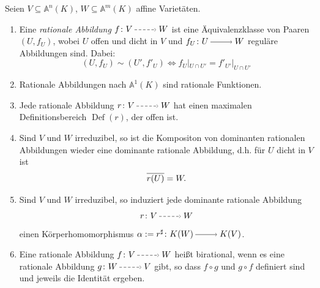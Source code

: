 \documentclass[a4paper,12pt]{scrbook}
\theoremstyle{keinenummern} %
\theoremstyle{mitnummern}
\theoremstyle{unserbeweis}
\def\A{\mathbb{A}}
\newcommand{\Def}{\operatorname{Def}}
\newcommand{\restrict}[1]{|_{#1}}
\newcommand{\ra}{\raisebox{-1pt}{\tikz{\draw[thin,shorten >=3pt, ->] (0,0) node{\hspace*{-2pt}} -- node{} (1,0);}}\penalty1000\relax}
\newcommand{\ppf}{\raisebox{-1pt}{\tikz{\draw[densely dashed,thin,shorten >=3pt, ->] (0,0) node{\hspace*{-2pt}} -- node{} (1,0);}}\penalty1000\relax}
\def\Bar#1{\ensuremath\overline{#1}}
\begin{document}
\begin{db}\label{1.6.5} Seien $V\subseteq \A^n(K)$, $W\subseteq \A^m(K)$ affine Varietäten.
  \begin{enumerate}
  \item\label{1.6.5a} Eine \emph{rationale Abbildung} $f \colon V\ppf W$ ist eine Äquivalenzklasse von Paaren $(U,f_U)$, wobei $U$ offen und dicht in $V$ und $f_U \colon U\ra W$ reguläre Abbildungen sind. Dabei:
  \[(U,f_U)\sim (U',f'_U) \iff f_U\restrict{U\cap U'}=f'_{U'}\restrict{U\cap U'}\]
  \item\label{1.6.5b} Rationale Abbildungen nach $\A^1(K)$ sind rationale Funktionen.
  \item\label{1.6.5c} Jede rationale Abbildung $r \colon V\ppf W$ hat einen maximalen Definitionsbereich $\Def(r)$, der offen ist.
  \item\label{1.6.5d} Sind $V$ und $W$ irreduzibel, so ist die Kompositon von dominanten rationalen Abbildungen wieder eine dominante rationale Abbildung, d.h. für $U$ dicht in $V$ ist \[\Bar{r(U)}=W.\]
  \item\label{1.6.5e} Sind $V$ und $W$ irreduzibel, so induziert jede dominante rationale Abbildung \[r \colon V\ppf W\] einen Körperhomomorphismus $\alpha:=r^{\sharp} \colon K(W)\ra K(V)$.
  \item\label{1.6.5f} Eine rationale Abbildung $f \colon V\ppf W$ heißt birational, wenn es eine rationale Abbildung $g \colon W\ppf V$ gibt, so dass $f\circ g$ und $g\circ f$ definiert sind und jeweils die Identität ergeben.
  \end{enumerate}
\end{db}
\end{document}
